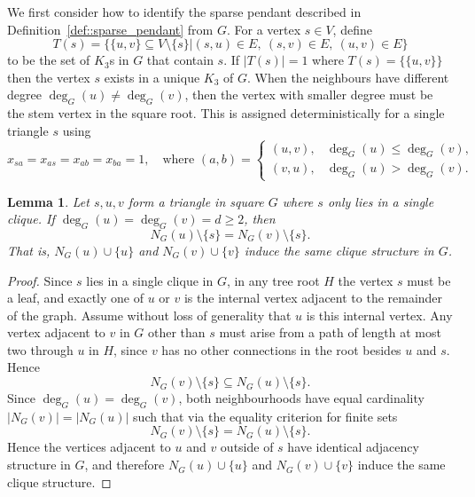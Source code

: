 \documentclass[11pt]{article}
\newtheorem{lemma}{Lemma}
\begin{document}
We first consider how to identify the sparse pendant described in Definition~\ref{def::sparse_pendant} from $G$. For a vertex $s \in V$, define
\[
T(s) = \bigl\{ \{u,v\} \subseteq V \setminus \{s\} \vert (s,u)\in E,\ (s,v)\in E,\ (u,v)\in E \bigr\}
\]
to be the set of $K_3$s in $G$ that contain $s$. If $|T(s)| = 1$ where $T(s) = \{\{u,v\}\}$ then the vertex $s$ exists in a unique $K_3$ of $G$. When the neighbours have different degree $\deg_G(u) \neq \deg_G(v)$, then the vertex with smaller degree must be the stem vertex in the square root. This is assigned deterministically for a single triangle $s$ using
\begin{equation} \label{eq::single_triangle_fix}
  x_{sa} = x_{as} = x_{ab} = x_{ba} = 1, \quad \text{where } (a,b) =
  \begin{cases}
  (u,v), & \deg_G(u) \leq \deg_G(v), \\
  (v,u), & \deg_G(u) > \deg_G(v).
  \end{cases}
\end{equation}

\begin{lemma} \label{lemma::single_triangle_equal_neighbourhood}
  Let $s,u,v$ form a triangle in square $G$ where $s$ only lies in a single clique. If $\deg_G(u)=\deg_G(v)=d\geq 2$, then
  \[
  N_G(u)\setminus\{s\}=N_G(v)\setminus\{s\}.
  \]
  That is, $N_G(u)\cup\{u\}$ and $N_G(v)\cup\{v\}$ induce the same clique structure in $G$.
\end{lemma}
\begin{proof}
  Since $s$ lies in a single clique in $G$, in any tree root $H$ the vertex $s$ must be a leaf, and exactly one of $u$ or $v$ is the internal vertex adjacent to the remainder of the graph. Assume without loss of generality that $u$ is this internal vertex. Any vertex adjacent to $v$ in $G$ other than $s$ must arise from a path of length at most two through $u$ in $H$, since $v$ has no other connections in the root besides $u$ and $s$. Hence
  \[
  N_G(v)\setminus\{s\}\subseteq N_G(u)\setminus\{s\}.
  \]
  Since $\deg_G(u)=\deg_G(v)$, both neighbourhoods have equal cardinality $|N_G(v)| = |N_G(u)|$ such that via the equality criterion for finite sets
  \[
  N_G(v)\setminus\{s\}
  =
  N_G(u)\setminus\{s\}.
  \]
  Hence the vertices adjacent to $u$ and $v$ outside of $s$ have identical adjacency structure in $G$, and therefore $N_G(u)\cup\{u\}$ and $N_G(v)\cup\{v\}$ induce the same clique structure.
\end{proof}
\end{document}
